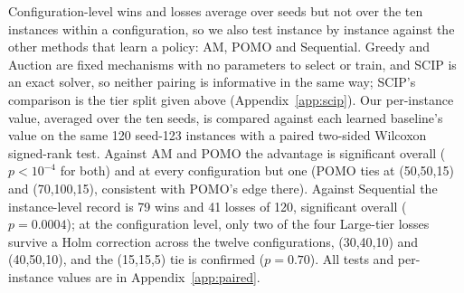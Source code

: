 Configuration-level wins and losses average over seeds but not over the ten
instances within a configuration, so we also test instance by instance against
the other methods that learn a policy: AM, POMO and Sequential. Greedy and
Auction are fixed mechanisms with no parameters to select or train, and SCIP
is an exact solver, so neither pairing is informative in the same way; SCIP's
comparison is the tier split given above (Appendix~\ref{app:scip}). Our
per-instance value, averaged over the ten seeds, is compared against each
learned baseline's value on the same 120 seed-123 instances with a paired
two-sided Wilcoxon signed-rank test. Against AM and POMO the advantage is
significant overall ($p<10^{-4}$ for both) and at every configuration but one
(POMO ties at (50,50,15) and (70,100,15), consistent with POMO's edge there).
Against Sequential the instance-level record is 79 wins and 41 losses of 120,
significant overall ($p=0.0004$); at the configuration level, only two of the
four Large-tier losses survive a Holm correction across the twelve
configurations, (30,40,10) and (40,50,10), and the (15,15,5) tie is confirmed
($p=0.70$). All tests and per-instance values are in Appendix~\ref{app:paired}.


